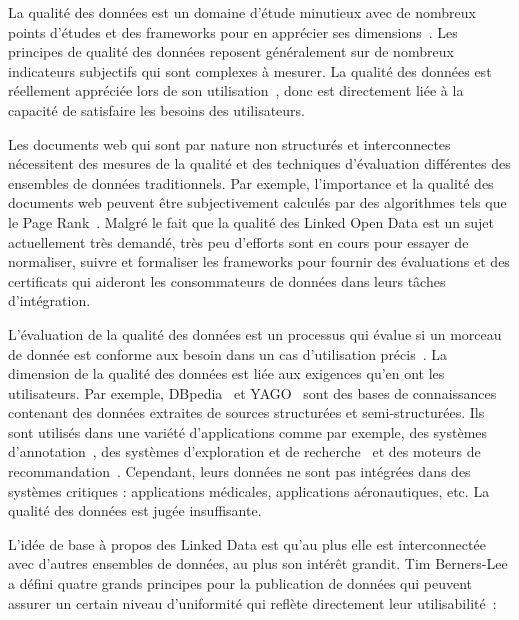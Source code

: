 La qualit\'{e} des donn\'{e}es est un domaine d'\'{e}tude minutieux avec de nombreux points d'\'{e}tudes et des frameworks pour en appr\'{e}cier ses dimensions~\cite{Kahn:ACM:02, Stvilia:ASIST:07, Wang:MIS:96}. Les principes de qualit\'{e} des donn\'{e}es reposent g\'{e}n\'{e}ralement sur de nombreux indicateurs subjectifs qui sont complexes à mesurer. La qualit\'{e} des donn\'{e}es est r\'{e}ellement appr\'{e}ci\'{e}e lors de son utilisation~\cite{Juran:McGraw:99}, donc est directement li\'{e}e à la capacit\'{e} de satisfaire les besoins des utilisateurs.

Les documents web qui sont par nature non structur\'{e}s et interconnectes n\'{e}cessitent des mesures de la qualit\'{e} et des techniques d'\'{e}valuation diff\'{e}rentes des ensembles de donn\'{e}es traditionnels. Par exemple, l'importance et la qualit\'{e} des documents web peuvent être subjectivement calcul\'{e}s par des algorithmes tels que le Page Rank~\cite{Page:TechReport:98}. Malgr\'{e} le fait que la qualit\'{e} des Linked Open Data est un sujet actuellement tr\`{e}s demand\'{e}, tr\`{e}s peu d'efforts sont en cours pour essayer de normaliser, suivre et formaliser les frameworks pour fournir des \'{e}valuations et des certificats qui aideront les consommateurs de donn\'{e}es dans leurs tâches d'int\'{e}gration.

L'\'{e}valuation de la qualit\'{e} des donn\'{e}es est un processus qui \'{e}value si un morceau de donn\'{e}e est conforme aux besoin dans un cas d'utilisation pr\'{e}cis~\cite{Bizer:WebSemantics:09}. La dimension de la qualit\'{e} des donn\'{e}es est li\'{e}e aux exigences qu'en ont les utilisateurs. Par exemple, DBpedia~\cite{Bizer:WebSemJorunal:09} et YAGO~\cite{Suchanek::WWW:07} sont des bases de connaissances contenant des donn\'{e}es extraites de sources structur\'{e}es et semi-structur\'{e}es. Ils sont utilis\'{e}s dans une vari\'{e}t\'{e} d'applications comme par exemple, des syst\`{e}mes d'annotation~\cite{Mendes:ICS:11}, des syst\`{e}mes d'exploration et de recherche~\cite{Marie:ICS:13} et des moteurs de recommandation~\cite{DiNoia:iSemantics:12}. Cependant, leurs donn\'{e}es ne sont pas int\'{e}gr\'{e}es dans des syst\`{e}mes critiques : applications m\'{e}dicales, applications a\'{e}ronautiques, etc. La qualit\'{e} des donn\'{e}es est jug\'{e}e insuffisante.

L'id\'{e}e de base à propos des Linked Data est qu'au plus elle est interconnect\'{e}e avec d'autres ensembles de donn\'{e}es, au plus son int\'{e}rêt grandit. Tim Berners-Lee a d\'{e}fini quatre grands principes pour la publication de donn\'{e}es qui peuvent assurer un certain niveau d'uniformit\'{e} qui refl\`{e}te directement leur utilisabilit\'{e}~\cite{Berners-Lee:W3C:06}:


